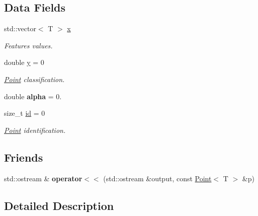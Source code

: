\subsection*{Data Fields}
\begin{DoxyCompactItemize}
\item 
\mbox{\label{class_point_a8b8cc26f89935fdc83ed464c053c0476}} 
std\+::vector$<$ T $>$ \mbox{\hyperlink{class_point_a8b8cc26f89935fdc83ed464c053c0476}{x}}
\begin{DoxyCompactList}\small\item\em Features values. \end{DoxyCompactList}\item 
\mbox{\label{class_point_abd1a56102bc430eb08fc37dac9aa4c0b}} 
double \mbox{\hyperlink{class_point_abd1a56102bc430eb08fc37dac9aa4c0b}{y}} = 0
\begin{DoxyCompactList}\small\item\em \mbox{\hyperlink{class_point}{Point}} classification. \end{DoxyCompactList}\item 
\mbox{\label{class_point_aa852a1c045d196abd841a6e1e87c27d8}} 
double {\bfseries alpha} = 0.
\item 
\mbox{\label{class_point_af7d6dfc3296421e9f10311d29720aa3b}} 
size\+\_\+t \mbox{\hyperlink{class_point_af7d6dfc3296421e9f10311d29720aa3b}{id}} = 0
\begin{DoxyCompactList}\small\item\em \mbox{\hyperlink{class_point}{Point}} identification. \end{DoxyCompactList}\end{DoxyCompactItemize}
\subsection*{Friends}
\begin{DoxyCompactItemize}
\item 
\mbox{\label{class_point_ae01781a3264312efb15b109d37fceb38}} 
std\+::ostream \& {\bfseries operator$<$$<$} (std\+::ostream \&output, const \mbox{\hyperlink{class_point}{Point}}$<$ T $>$ \&p)
\end{DoxyCompactItemize}


\subsection{Detailed Description}
